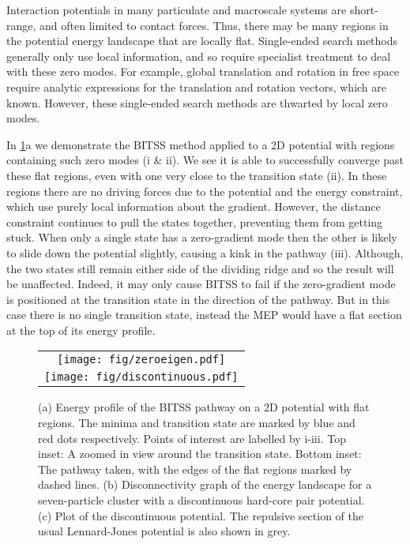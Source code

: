 \documentclass[aps,twocolumn]{revtex4-1}
\begin{document}
\topic Interaction potentials in many particulate and macroscale systems are short-range, and often limited to contact forces.
Thus, there may be many regions in the potential energy landscape that are locally flat.
Single-ended search methods generally only use local information, and so require specialist treatment to deal with these zero modes.
For example, global translation and rotation in free space require analytic expressions for the translation and rotation vectors, which are known.
However, these single-ended search methods are thwarted by local zero modes.

\topic In \cref{fig:flatdiscontinuous}a we demonstrate the BITSS method applied to a 2D potential with regions containing such zero modes (i \& ii).
We see it is able to successfully converge past these flat regions, even with one very close to the transition state (ii).
In these regions there are no driving forces due to the potential and the energy constraint, which use purely local information about the gradient.
However, the distance constraint continues to pull the states together, preventing them from getting stuck.
When only a single state has a zero-gradient mode then the other is likely to slide down the potential slightly, causing a kink in the pathway (iii).
Although, the two states still remain either side of the dividing ridge and so the result will be unaffected.
Indeed, it may only cause BITSS to fail if the zero-gradient mode is positioned at the transition state in the direction of the pathway.
But in this case there is no single transition state, instead the MEP would have a flat section at the top of its energy profile.

\begin{figure}[tb]
  \centering
  \begin{tabular}[b]{c}
    \texttt{[image: fig/zeroeigen.pdf]}\\
    \texttt{[image: fig/discontinuous.pdf]}
  \end{tabular}
  \caption{
    (a) Energy profile of the BITSS pathway on a 2D potential with flat regions.
        The minima and transition state are marked by blue and red dots respectively.
        Points of interest are labelled by i-iii.
        Top inset: A zoomed in view around the transition state.
        Bottom inset: The pathway taken, with the edges of the flat regions marked by dashed lines.
    (b) Disconnectivity graph of the energy landscape for a seven-particle cluster with a discontinuous hard-core pair potential.
    (c) Plot of the discontinuous potential.
        The repulsive section of the usual Lennard-Jones potential is also shown in grey.
  }
  \label{fig:flatdiscontinuous}
\end{figure}
\end{document}
